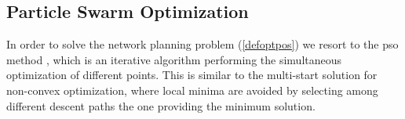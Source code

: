 \documentclass[conference,final]{IEEEtran}
\begin{document}
 

\subsection{Particle Swarm Optimization}

In order to solve the network planning problem (\ref{defoptpos}) we resort to the \ac{pso} method \cite{Kennedy-11}, which is an iterative algorithm performing the simultaneous optimization of different points. This is similar to the multi-start solution for non-convex optimization, where local minima are avoided by selecting among different descent paths the one providing the minimum solution. 
\end{document}
